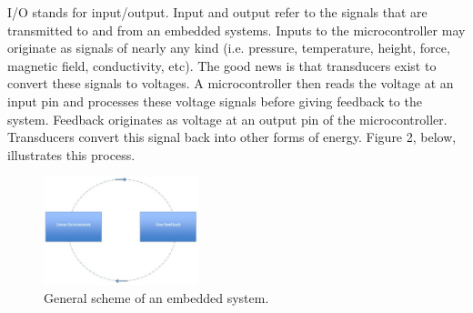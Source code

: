 \documentclass[10pt]{report}
\begin{document}
I/O stands for input/output. Input and output refer to the signals that are transmitted to and from an embedded systems. Inputs to the microcontroller may originate as signals of nearly any kind (i.e. pressure, temperature, height, force, magnetic field, conductivity, etc). The good news is that transducers exist to convert these signals to voltages. A microcontroller then reads the voltage at an input pin and processes these voltage signals before giving feedback to the system. Feedback originates as voltage at an output pin of the microcontroller. Transducers convert this signal back into other forms of energy. Figure 2, below, illustrates this process.

\begin{figure}[H]
\centering
   \includegraphics[width=0.4\textwidth]{feedback.jpg}
    \caption{General scheme of an embedded system.}
\end{figure}
\end{document}
